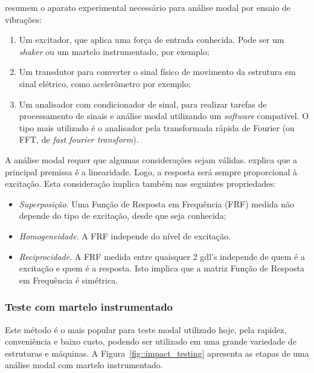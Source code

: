\citet{rao2011mechanical} resumem o aparato experimental necessário para análise
modal por ensaio de vibrações:
%
\begin{enumerate}
  \item Um excitador, que aplica uma força de entrada conhecida. Pode ser um
  \textit{shaker} ou um martelo instrumentado, por exemplo;
  \item Um transdutor para converter o sinal físico de movimento da estrutura em
  sinal elétrico, como acelerômetro por exemplo;
  \item Um analisador com condicionador de sinal, para realizar tarefas de
  processamento de sinais e análise modal utilizando um \textit{software} compatível. O tipo mais
  utilizado é o analisador pela transformada rápida de Fourier (ou FFT, de
  \textit{fast fourier transform}). 
\end{enumerate}

A análise modal requer que algumas considerações sejam válidas.
\citet{dossing1988structural} explica que a principal premissa é a linearidade.
Logo, a resposta será sempre proporcional à excitação. Esta consideração implica
também nas seguintes propriedades:
%
\begin{itemize}	
  \item \emph{Superposição}. Uma Função de Resposta em Frequência (FRF) medida
  não depende do tipo de excitação, desde que seja conhecida;
  \item \emph{Homogeneidade}. A FRF independe do nível de excitação.
  \item \emph{Reciprocidade}. A FRF medida entre quaisquer 2 gdl's independe
  de quem é a excitação e quem é a resposta. Isto implica que a matriz Função de
  Resposta em Frequência é simétrica.
\end{itemize}

\subsubsection{Teste com martelo instrumentado}

Este método é o mais popular para teste modal utilizado hoje, pela rapidez,
conveniência e baixo custo, podendo ser utilizado em uma grande variedade de
estruturas e máquinas. A Figura~\ref{fig::impact_testing} apresenta as etapas de
uma análise modal com martelo instrumentado.

